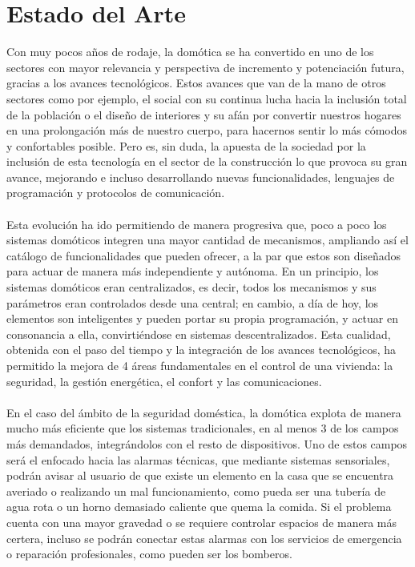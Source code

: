 \chapter{Estado del Arte}

Con muy pocos años de rodaje, la domótica se ha convertido en uno de los sectores con mayor relevancia y perspectiva de incremento y potenciación futura, gracias a los avances tecnológicos. Estos avances que van de la mano de otros sectores como por ejemplo, el social con su continua lucha hacia la inclusión total de la población o el diseño de interiores y su afán por convertir nuestros hogares en una prolongación más de nuestro cuerpo, para hacernos sentir lo más cómodos y confortables posible. Pero es, sin duda, la apuesta de la sociedad por la inclusión de esta tecnología en el sector de la construcción lo que provoca su gran avance, mejorando e incluso desarrollando nuevas funcionalidades, lenguajes de programación y protocolos de comunicación.\\\\
Esta evolución ha ido permitiendo de manera progresiva que, poco a poco los sistemas domóticos integren una mayor cantidad de mecanismos, ampliando así el catálogo de funcionalidades que pueden ofrecer, a la par que estos son diseñados para actuar de manera más independiente y autónoma. En un principio, los sistemas domóticos eran centralizados, es decir, todos los mecanismos y sus parámetros eran controlados desde una central; en cambio, a día de hoy, los elementos son inteligentes y pueden portar su propia programación, y actuar en consonancia a ella, convirtiéndose en sistemas descentralizados. Esta cualidad, obtenida con el paso del tiempo y la integración de los avances tecnológicos, ha permitido la mejora de 4 áreas fundamentales en el control de una vivienda: la seguridad, la gestión energética, el confort y las comunicaciones.\\\\
En el caso del ámbito de la seguridad doméstica, la domótica explota de manera mucho más eficiente que los sistemas tradicionales, en al menos 3 de los campos más demandados, integrándolos con el resto de dispositivos. Uno de estos campos será el enfocado hacia las alarmas técnicas, que mediante sistemas sensoriales, podrán avisar al usuario de que existe un elemento en la casa que se encuentra averiado o realizando un mal funcionamiento, como pueda ser una tubería de agua rota o un horno demasiado caliente que quema la comida. Si el problema cuenta con una mayor gravedad o se requiere controlar espacios de manera más certera, incluso se podrán conectar estas alarmas con los servicios de emergencia o reparación profesionales, como pueden ser los bomberos. \\\\
